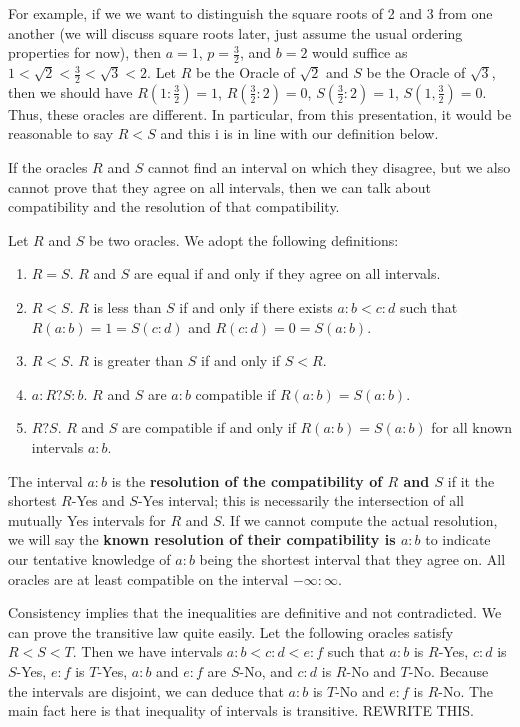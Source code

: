 \documentclass[12pt]{article}
\theoremstyle{remark}
\begin{document}
For example, if we we want to distinguish the square roots of 2 and 3 from one another (we will discuss square roots later, just assume the usual ordering properties for now), then $a = 1$, $p = \tfrac{3}{2}$, and $b = 2$ would suffice as $1 < \sqrt{2} < \tfrac{3}{2} < \sqrt{3} < 2$. Let $R$ be the Oracle of $\sqrt{2}$ and $S$ be the Oracle of $\sqrt{3}$, then we should have $R(1:\tfrac{3}{2}) = 1$, $R(\tfrac{3}{2}:2) = 0$,  $S(\tfrac{3}{2}:2) = 1$, $S(1, \tfrac{3}{2}) = 0$. Thus, these oracles are different. In particular, from this presentation, it would be reasonable to say $R < S$ and this i is in line with our definition below.

If the oracles $R$ and $S$ cannot find an interval on which they disagree, but we also cannot prove that they agree on all intervals, then we can talk about compatibility and the resolution of that compatibility.

Let $R$ and $S$ be two oracles. We adopt the following definitions:

\begin{enumerate}
    \item $R=S$. $R$ and $S$ are equal if and only if they agree on all intervals. 
    \item $R < S$. $R$ is less than $S$ if and only if there exists $a:b < c:d$ such that $R(a:b) =1 = S(c:d)$ and $R(c:d) = 0 = S(a:b)$. 
    \item $R < S$. $R$ is greater than $S$ if and only if $S < R$.
    \item $a:R?S:b$. $R$ and $S$ are $a:b$ compatible if $R(a:b)=S(a:b)$.
    \item $R ? S$. $R$ and $S$ are compatible if and only if $R(a:b) = S(a:b)$ for all known intervals $a:b$. 
\end{enumerate}

The interval $a:b$ is the \textbf{resolution of the compatibility of $R$ and $S$} if it the shortest $R$-Yes and $S$-Yes interval; this is necessarily the intersection of all mutually Yes intervals for $R$ and $S$. If we cannot compute the actual resolution, we will say the \textbf{known resolution of their compatibility is $a:b$} to indicate our tentative knowledge of $a:b$ being the shortest interval that they agree on. All oracles are at least compatible on the interval $-\infty:\infty$.

Consistency implies that the inequalities are definitive and not contradicted. We can prove the transitive law quite easily. Let the following oracles satisfy $R < S < T$. Then we have intervals $a:b < c:d < e:f$ such that $a:b$ is $R$-Yes, $c:d$ is $S$-Yes, $e:f$ is $T$-Yes, $a:b$ and $e:f$ are $S$-No, and $c:d$ is $R$-No and $T$-No. Because the intervals are disjoint, we can deduce that $a:b$ is $T$-No and $e:f$ is $R$-No. The main fact here is that inequality of intervals is transitive. REWRITE THIS. 
\end{document}
